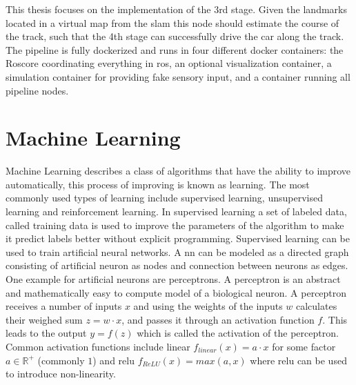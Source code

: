This thesis focuses on the implementation of the 3rd stage. Given the landmarks located in a virtual map from the \ac{slam} this node should estimate the course of the track, such that the 4th stage can successfully drive the car along the track.
The pipeline is fully dockerized and runs in four different docker containers: the Roscore coordinating everything in \ac{ros}, an optional visualization container, a simulation container for providing fake sensory input, and a container running all pipeline nodes.

\section{Machine Learning}
Machine Learning describes a class of algorithms that have the ability to improve automatically, this process of improving is known as learning. The most commonly used types of learning include supervised learning, unsupervised learning and reinforcement learning\cite{Dey2016}. In supervised learning a set of labeled data, called training data is used to improve the parameters of the algorithm to make it predict labels better without explicit programming. Supervised learning can be used to train artificial neural networks. A \ac{nn} can be modeled as a directed graph consisting of artificial neuron as nodes and connection between neurons as edges. One example for artificial neurons are perceptrons. A perceptron is an abstract and mathematically easy to compute model of a biological neuron. A perceptron receives a number of inputs $x$ and using the weights of the inputs $w$ calculates their weighed sum $z=w \cdot x$, and passes it through an activation function $f$. This leads to the output
$y=f(z)$ which is called the activation of the perceptron. Common activation functions include linear $f_{linear}(x)=a \cdot x$ for some factor $a \in \mathbb{R^+}$ (commonly $1$) and \ac{relu} $f_{ReLU}(x)=max(a,x)$ \cite{Ramachandran2017} where \ac{relu} can be used to introduce non-linearity.

